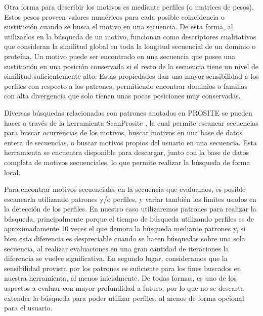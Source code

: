 Otra forma para describir los motivos es mediante perfiles (o matrices de pesos). Estos pesos proveen valores numéricos para cada posible coincidencia o sustitución cuando se busca el motivo en una secuencia. 
De esta forma, al utilizarlos en la búsqueda de un motivo, funcionan como descriptores cualitativos que consideran la similitud global en toda la longitud secuencial de un dominio o proteína. 
Un motivo puede ser encontrado en una secuencia que posee una sustitución en una posición conservada si el resto de la secuencia tiene un nivel de similitud suficientemente alto.
Estas propiedades dan una mayor sensibilidad a los perfiles con respecto a los patrones, permitiendo encontrar dominios o familias con alta divergencia que solo tienen unas pocas posiciones muy conservadas.

Diversas búsquedas relacionadas con patrones anotados en PROSITE se pueden hacer a través de la herramienta ScanProsite \cite{de2006scanprosite,scanprositeWeb}, 
la cual permite escanear secuencias para buscar ocurrencias de los motivos, buscar motivos en una base de datos entera de secuencias, o buscar motivos propios del usuario en una secuencia.
Esta herramienta se encuentra disponible para descargar, junto con la base de datos completa de motivos secuenciales, lo que permite realizar la búsqueda de forma local.

Para encontrar motivos secuenciales en la secuencia que evaluamos, es posible escanearla utilizando patrones y/o perfiles, y variar también los límites usados en la detección de los perfiles. 
En nuestro caso utilizaremos patrones para realizar la búsqueda, principalmente porque el tiempo de búsqueda utilizando perfiles es de aproximadamente 10 veces el que demora la búsqueda mediante patrones 
y, si bien esta diferencia es despreciable cuando se hacen búsquedas sobre una sola secuencia, al realizar evaluaciones en una gran cantidad de iteraciones la diferencia se vuelve significativa.
En segundo lugar, consideramos que la sensibilidad provista por los patrones es suficiente para los fines buscados en nuestra herramienta, al menos inicialmente.
De todas formas, es uno de los aspectos a evaluar con mayor profundidad a futuro, por lo que no se descarta extender la búsqueda para poder utilizar perfiles, al menos de forma opcional para el usuario. 

